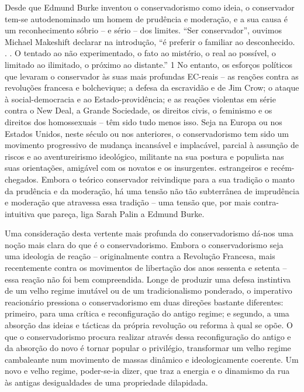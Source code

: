 \par
 
Desde que Edmund Burke inventou o conservadorismo como ideia, o conservador tem-se autodenominado um homem de prudência e moderação, e a sua causa é um reconhecimento sóbrio – e sério – dos limites. “Ser conservador”, ouvimos Michael Makeshift declarar na introdução, “é preferir o familiar ao desconhecido. . . O tentado ao não experimentado, o fato ao mistério, o real ao possível, o limitado ao ilimitado, o próximo ao distante.”
 {\color{blue} 1}  
No entanto, os esforços políticos que levaram o conservador às suas mais profundas EC-reais – as reações contra as revoluções francesa e bolchevique; a defesa da escravidão e de Jim Crow; o ataque à social-democracia e ao Estado-providência; e as reações violentas em série contra o New Deal, a Grande Sociedade, os direitos civis, o feminismo e os direitos dos homossexuais – têm sido tudo menos isso. Seja na Europa ou nos Estados Unidos, neste século ou nos anteriores, o conservadorismo tem sido um movimento progressivo de mudança incansável e implacável, parcial à assunção de riscos e ao aventureirismo ideológico, militante na sua postura e populista nas suas orientações, amigável com os novatos e os insurgentes.  estrangeiros e recém-chegados. Embora o teórico conservador reivindique para a sua tradição o manto da prudência e da moderação, há uma tensão não tão subterrânea de imprudência e moderação que atravessa essa tradição – uma tensão que, por mais contra-intuitiva que pareça, liga Sarah Palin a Edmund Burke.
 
\par
 
Uma consideração desta vertente mais profunda do conservadorismo dá-nos uma noção mais clara do que é o conservadorismo. Embora o conservadorismo seja uma ideologia de reação – originalmente contra a Revolução Francesa, mais recentemente contra os movimentos de libertação dos anos sessenta e setenta – essa reação não foi bem compreendida. Longe de produzir uma defesa instintiva de um velho regime imutável ou de um tradicionalismo ponderado, o imperativo reacionário pressiona o conservadorismo em duas direções bastante diferentes: primeiro, para uma crítica e reconfiguração do antigo regime; e segundo, a uma absorção das ideias e tácticas da própria revolução ou reforma à qual se opõe. O que o conservadorismo procura realizar através dessa reconfiguração do antigo e da absorção do novo é tornar popular o privilégio, transformar um velho regime cambaleante num movimento de massas dinâmico e ideologicamente coerente. Um novo e velho regime, poder-se-ia dizer, que traz a energia e o dinamismo da rua às antigas desigualdades de uma propriedade dilapidada.
 
